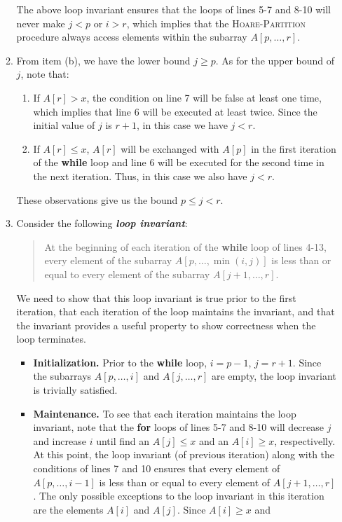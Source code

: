 \begin{enumerate}
\begin{framed}
\begin{enumerate}
{The above loop invariant ensures that the  loops of lines 5-7 and
8-10 will never make $j < p$ or $i > r$, which implies that the
\textsc{Hoare-Partition} procedure always access elements within the subarray
$A[p, \dots, r]$.
}
\item{From item (b), we have the lower bound $j \ge p$. As for the upper bound
of $j$, note that:
\begin{enumerate}
  \item If $A[r] > x$, the condition on line 7 will be false at least one time,
    which implies that line 6 will be executed at least twice. Since the initial
    value of $j$ is $r + 1$, in this case we have $j < r$.
  \item If $A[r] \le x$, $A[r]$ will be exchanged with $A[p]$ in the first
    iteration of the \textbf{while} loop and line 6 will be executed for the
    second time in the next iteration. Thus, in this case we also have $j < r$.
\end{enumerate}
These observations give us the bound $p \le j < r$.
}
\item{Consider the following \textbf{\emph{loop invariant}}:
\begin{quote}
At the beginning of each iteration of the \textbf{while} loop of lines 4-13,
every element of the subarray $A[p, \dots, \min(i, j)]$ is less than or equal
to every element of the subarray $A[j + 1, \dots, r]$.
\end{quote}
We need to show that this loop invariant is true prior to the first iteration,
that each iteration of the loop maintains the invariant, and that the invariant
provides a useful property to show correctness when the loop terminates.
\begin{itemize}
\item \textbf{Initialization.} Prior to the \textbf{while} loop, $i = p - 1$,
$j = r + 1$. Since the subarrays $A[p, \dots, i]$ and $A[j, \dots, r]$ are
empty, the loop invariant is trivially satisfied.
\item \textbf{Maintenance.} To see that each iteration maintains the loop
invariant, note that the \textbf{for} loops of lines 5-7 and 8-10 will decrease
$j$ and increase $i$ until find an $A[j] \le x$ and an $A[i] \ge x$,
respectivelly. At this point, the loop invariant (of previous iteration)
along with the conditions of lines 7 and 10 ensures that every element of
$A[p, \dots, i - 1]$ is less than or equal to every element of
$A[j + 1, \dots, r]$. The only possible exceptions to the loop invariant in this
iteration are the elements $A[i]$ and $A[j]$. Since $A[i] \ge x$ and

\end{itemize}}
\end{enumerate}
\end{framed}
\end{enumerate}
